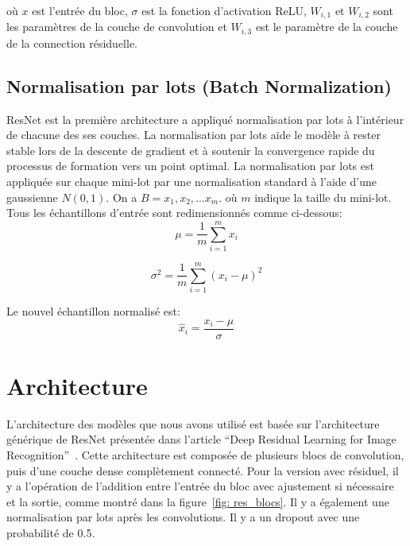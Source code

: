 \documentclass{article}
\begin{document}
où $x$ est l'entrée du bloc, $\sigma$ est la fonction d'activation ReLU, $W_{i,1}$ et $W_{i,2}$ sont les paramètres de la
couche de convolution et $W_{i,3}$ est le paramètre de la couche de la connection résiduelle.


\subsection{Normalisation par lots (Batch Normalization)}
ResNet est la première architecture a appliqué normalisation par lots à l'intérieur de chacune des ses couches. La normalisation par lots aide le
modèle à rester stable lors de la descente de gradient et à soutenir la convergence rapide du processus de formation vers
un point optimal.
La normalisation par lots est appliquée sur chaque mini-lot par une normalisation standard à l'aide d'une gaussienne $N(0,1)$.
On a $B=x_1,x_2,\dots x_m$.
où $m$ indique la taille du mini-lot. Tous les échantillons d'entrée sont redimensionnés comme ci-dessous:
\begin{equation}
    \mu = \frac{1}{m}\sum_{i=1}^{m}x_{i}
\end{equation}

\begin{equation}
    \sigma^{2} = \frac{1}{m}\sum_{i=1}^{m}(x_{i} - \mu)^{2}
\end{equation}

Le nouvel échantillon normalisé est:
\begin{equation}
    \hat{x}_{i} = \frac{x_{i} - \mu}{\sigma}
\end{equation}

\section{Architecture}

L'architecture des modèles que nous avons utilisé est basée sur l'architecture générique de ResNet présentée dans l'article
``Deep Residual Learning for Image Recognition''~\cite{resnet}. Cette architecture est composée de plusieurs blocs de
convolution, puis d'une couche dense complètement connecté. Pour la version avec résiduel, il y a l'opération de l'addition entre
l'entrée du bloc avec ajustement si nécessaire et la sortie, comme montré dans la figure~\ref{fig: res_blocs}.
Il y a également une normalisation par lots après les convolutions.
Il y a un dropout avec une probabilité de 0.5.
\end{document}
